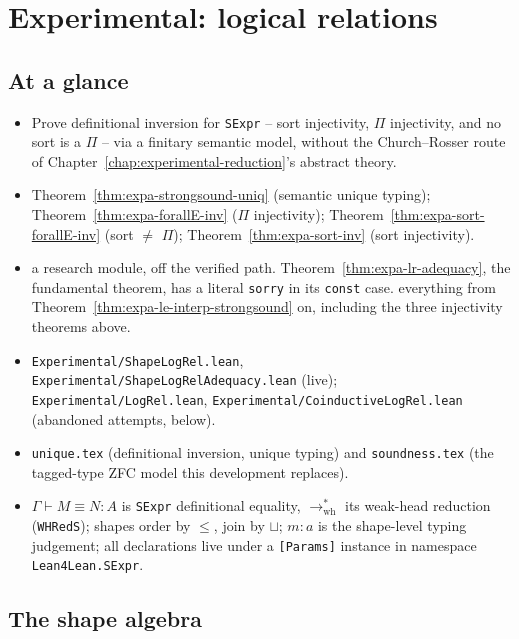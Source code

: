\chapter{Experimental: logical relations}
\label{chap:experimental-logrel}

\section*{At a glance}
\begin{itemize}
\item {} Prove definitional inversion for \texttt{SExpr} -- sort injectivity, $\Pi$
injectivity, and no sort is a $\Pi$ -- via a finitary semantic model, without the Church--Rosser
route of Chapter~\ref{chap:experimental-reduction}'s abstract theory.
\item {} Theorem~\ref{thm:expa-strongsound-uniq} (semantic unique typing);
Theorem~\ref{thm:expa-forallE-inv} ($\Pi$ injectivity); Theorem~\ref{thm:expa-sort-forallE-inv}
(sort $\neq$ $\Pi$); Theorem~\ref{thm:expa-sort-inv} (sort injectivity).
\item {} \stExperimental{} a research module, off the verified path.
\stSorry{} Theorem~\ref{thm:expa-lr-adequacy}, the fundamental theorem, has a literal \texttt{sorry}
in its \texttt{const} case. \stTainted{} everything from Theorem~\ref{thm:expa-le-interp-strongsound}
on, including the three injectivity theorems above.
\item {} \texttt{Experimental/ShapeLogRel.lean},
\texttt{Experimental/ShapeLogRelAdequacy.lean} (live); \texttt{Experimental/LogRel.lean},
\texttt{Experimental/CoinductiveLogRel.lean} (abandoned attempts, below).
\item {} \texttt{unique.tex} (definitional inversion, unique typing) and
\texttt{soundness.tex} (the tagged-type ZFC model this development replaces).
\item {} $\Gamma\vdash M\equiv N:A$ is \texttt{SExpr} definitional equality,
$\to^{*}_{\mathrm{wh}}$ its weak-head reduction (\texttt{WHRedS}); shapes order by $\le$, join by
$\sqcup$; $m:a$ is the shape-level typing judgement; all declarations live under a
\texttt{[Params]} instance in namespace \texttt{Lean4Lean.SExpr}.
\end{itemize}

\section{The shape algebra}

